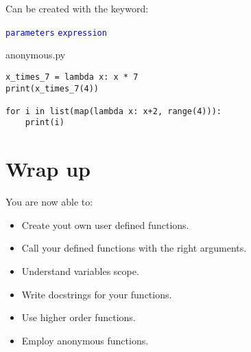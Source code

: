 \documentclass[aspectratio=1610,slidestop]{beamer}
\newcommand{\decl}[1]{\textcolor{blue}{\lstinline{#1}}}
\begin{document}
\begin{pframe}
 Can be created with the  keyword:
 \begin{pythondeclaration}
  \textvisiblespace\decl{parameters}\emp{:}\textvisiblespace
  \decl{expression}
 \end{pythondeclaration}
 \bigskip

 \begin{minipage}[t]{0.60\textwidth}
 \vspace{-3.25cm}
  \begin{pythonfile}{anonymous.py}
   \begin{verbatim}
x_times_7 = lambda x: x * 7
print(x_times_7(4))

for i in list(map(lambda x: x+2, range(4))):
    print(i)
   \end{verbatim}
  \end{pythonfile}
 \end{minipage}\qquad
 \pause
 \begin{minipage}[t]{0.35\textwidth}
 \begin{terminal}
 \end{terminal}
 \end{minipage}
\end{pframe}


\section*{Wrap up}

\begin{pframe}
 You are now able to:
 \begin{itemize}
  \item Create yout own user defined functions.
  \item Call your defined functions with the right arguments.
  \item Understand variables scope.
  \item Write docstrings for your functions.
  \item Use higher order functions.
  \item Employ anonymous functions.
 \end{itemize}

\end{pframe}
\end{document}
